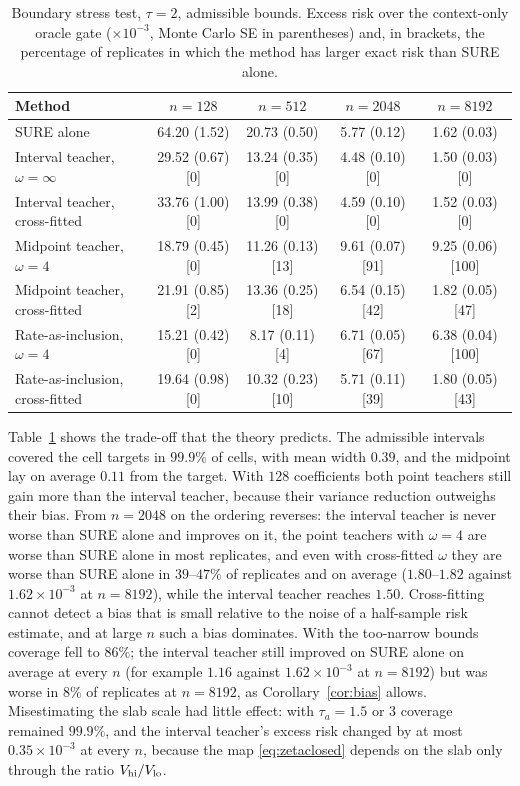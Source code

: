 \documentclass[11pt]{article}
\theoremstyle{plain}
\theoremstyle{definition}
\theoremstyle{remark}
\begin{document}
\begin{table}[htbp]
\centering\small
\caption{Boundary stress test, $\tau=2$, admissible bounds. Excess risk over the context-only
oracle gate ($\times10^{-3}$, Monte Carlo SE in parentheses) and, in brackets, the percentage of
replicates in which the method has larger exact risk than SURE alone.}
\label{tab:stress}
\begin{tabular}{lcccc}
\toprule
Method & $n=128$ & $n=512$ & $n=2048$ & $n=8192$\\
\midrule
SURE alone & 64.20 (1.52) & 20.73 (0.50) & 5.77 (0.12) & 1.62 (0.03)\\
Interval teacher, $\omega=\infty$ & 29.52 (0.67) [0] & 13.24 (0.35) [0] & 4.48 (0.10) [0] & 1.50 (0.03) [0]\\
Interval teacher, cross-fitted & 33.76 (1.00) [0] & 13.99 (0.38) [0] & 4.59 (0.10) [0] & 1.52 (0.03) [0]\\
Midpoint teacher, $\omega=4$ & 18.79 (0.45) [0] & 11.26 (0.13) [13] & 9.61 (0.07) [91] & 9.25 (0.06) [100]\\
Midpoint teacher, cross-fitted & 21.91 (0.85) [2] & 13.36 (0.25) [18] & 6.54 (0.15) [42] & 1.82 (0.05) [47]\\
Rate-as-inclusion, $\omega=4$ & 15.21 (0.42) [0] & 8.17 (0.11) [4] & 6.71 (0.05) [67] & 6.38 (0.04) [100]\\
Rate-as-inclusion, cross-fitted & 19.64 (0.98) [0] & 10.32 (0.23) [10] & 5.71 (0.11) [39] & 1.80 (0.05) [43]\\
\bottomrule
\end{tabular}
\end{table}

Table~\ref{tab:stress} shows the trade-off that the theory predicts. The admissible intervals
covered the cell targets in $99.9\%$ of cells, with mean width $0.39$, and the midpoint lay on
average $0.11$ from the target. With $128$ coefficients both point teachers still gain more than
the interval teacher, because their variance reduction outweighs their bias. From $n=2048$ on the
ordering reverses: the interval teacher is never worse than SURE alone and improves on it, the
point teachers with $\omega=4$ are worse than SURE alone in most replicates, and even with
cross-fitted $\omega$ they are worse than SURE alone in $39$--$47\%$ of replicates and on average
($1.80$--$1.82$ against $1.62\times10^{-3}$ at $n=8192$), while the interval teacher reaches
$1.50$. Cross-fitting cannot detect a bias that is small relative to the noise of a half-sample
risk estimate, and at large $n$ such a bias dominates. With the too-narrow bounds coverage fell
to $86\%$; the interval teacher still improved on SURE alone on average at every $n$ (for
example $1.16$ against $1.62\times10^{-3}$ at $n=8192$) but was worse in $8\%$ of replicates at
$n=8192$, as Corollary~\ref{cor:bias} allows. Misestimating the slab scale had little effect:
with $\tau_a=1.5$ or $3$ coverage remained $99.9\%$, and the interval teacher's excess risk changed
by at most $0.35\times10^{-3}$ at every $n$, because the map \eqref{eq:zetaclosed} depends on the
slab only through the ratio $V_{\rm hi}/V_{\rm lo}$.
\end{document}

